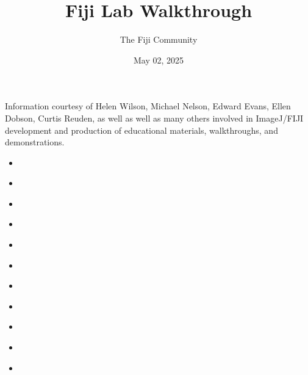\documentclass[letterpaper,10pt,english]{jupyterBook}
\title{Fiji Lab Walkthrough}
\date{May 02, 2025}
\author{The Fiji Community}
\begin{document}
\pagestyle{empty}
\sphinxmaketitle
\pagestyle{plain}
\sphinxtableofcontents
\pagestyle{normal}
\label{\detokenize{intro::doc}}


\sphinxAtStartPar
Information courtesy of Helen Wilson, Michael Nelson, Edward Evans, Ellen Dobson, Curtis Reuden,
as well as well as many others involved in ImageJ/FIJI development and production of
educational materials, walkthroughs, and demonstrations.
\begin{itemize}
\item {} 
\sphinxAtStartPar
{\hyperref[\detokenize{installation::doc}]{}}

\item {} 
\sphinxAtStartPar
{\hyperref[\detokenize{keyboard-shortcuts::doc}]{}}

\item {} 
\sphinxAtStartPar
{\hyperref[\detokenize{basics::doc}]{}}

\item {} 
\sphinxAtStartPar
{\hyperref[\detokenize{basic-segmentation::doc}]{}}

\item {} 
\sphinxAtStartPar
{\hyperref[\detokenize{basic-registration::doc}]{}}

\item {} 
\sphinxAtStartPar
{\hyperref[\detokenize{basic-scripting::doc}]{}}

\item {} 
\sphinxAtStartPar
{\hyperref[\detokenize{deconvolution::doc}]{}}

\item {} 
\sphinxAtStartPar
{\hyperref[\detokenize{background-subtraction::doc}]{}}

\item {} 
\sphinxAtStartPar
{\hyperref[\detokenize{trackmate::doc}]{}}

\item {} 
\sphinxAtStartPar
{\hyperref[\detokenize{labkit::doc}]{}}

\item {} 
\sphinxAtStartPar
{\hyperref[\detokenize{extra-resources::doc}]{}}

\end{itemize}
\end{document}
